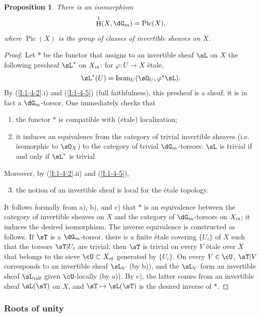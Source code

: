 \documentclass[12pt,oneside,english]{smfbook}
\DeclareMathOperator{\h}{H}
\DeclareMathOperator{\pic}{Pic}
\newcommand{\et}[1]{{#1}_{\textnormal{et}}}
\newtheorem{proposition}[subsubsection]{Proposition}
\begin{document}
\begin{proposition}\label{I:2-2-3}
There is an isomorphism
\[
  \h^1(X,\dG_m) = \pic(X)\text{,}
\]
where $\pic(X)$ is the group of classes of invertible sheaves on $X$.
\end{proposition}
\begin{proof}
Let $*$ be the functor that assigns to an invertible sheaf $\sL$ on $X$ the following presheaf $\sL^*$ on $\et X$: for $\varphi:U\to X$ étale,
\[
  \sL^*(U)=\operatorname{Isom}_U(\sO_U,\varphi^*\sL)\text{.}
\]
By (\ref{I:1-4-2}.i) and (\ref{I:1-4-5}) (full faithfulness), this presheaf is a sheaf; it is in fact a $\dG_m$-torsor. One immediately checks that
\begin{enumerate}[\indent a)]
  \item the functor $*$ is compatible with (étale) localization;
  \item it induces an equivalence from the category of trivial invertible sheaves (i.e. isomorphic to $\sO_X$) to the category of trivial $\dG_m$-torsors: $\sL$ is trivial if and only if $\sL^*$ is trivial.
\end{enumerate}

Moreover, by (\ref{I:1-4-2}.ii) and (\ref{I:1-4-5}),
\begin{enumerate}[\indent a)]
\setcounter{enumi}{2}
  \item the notion of an invertible sheaf is local for the étale topology.
\end{enumerate}

It follows formally from a), b), and c) that $*$ is an equivalence between the category of invertible sheaves on $X$ and the category of $\dG_m$-torsors on $\et X$; it induces the desired isomorphism. The inverse equivalence is constructed as follows. If $\sT$ is a $\dG_m$-torsor, there is a finite étale covering $\{U_i\}$ of $X$ such that the torsors $\sT|U_i$ are trivial; then $\sT$ is trivial on every $V$ étale over $X$ that belongs to the sieve $\cU\subset\et X$ generated by $\{U_i\}$. On every $V\in\cU$, $\sT|V$ corresponds to an invertible sheaf $\sL_V$ (by b)), and the $\sL_V$ form an invertible sheaf $\sL_\cU$ given $\cU$-locally (by a)). By c), the latter comes from an invertible sheaf $\sL(\sT)$ on $X$, and $\sT\mapsto\sL(\sT)$ is the desired inverse of $*$.
\end{proof}

\subsubsection{Roots of unity}\label{I:2-2-4}
\end{document}
